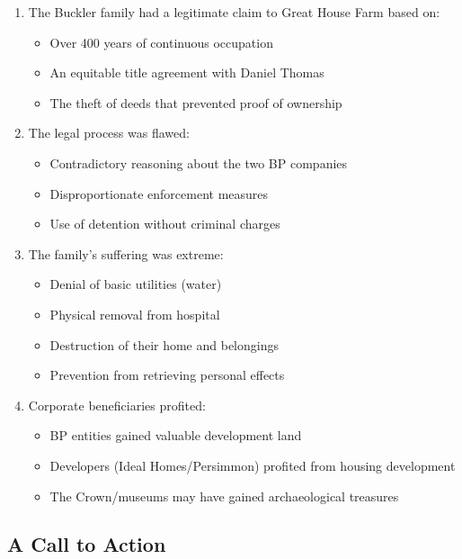 \documentclass[11pt,a4paper]{article}
\begin{document}
\begin{enumerate}[label=\arabic*.]
    \item The Buckler family had a legitimate claim to Great House Farm based on:
    \begin{itemize}
        \item Over 400 years of continuous occupation
        \item An equitable title agreement with Daniel Thomas
        \item The theft of deeds that prevented proof of ownership
    \end{itemize}
    
    \item The legal process was flawed:
    \begin{itemize}
        \item Contradictory reasoning about the two BP companies
        \item Disproportionate enforcement measures
        \item Use of detention without criminal charges
    \end{itemize}
    
    \item The family's suffering was extreme:
    \begin{itemize}
        \item Denial of basic utilities (water)
        \item Physical removal from hospital
        \item Destruction of their home and belongings
        \item Prevention from retrieving personal effects
    \end{itemize}
    
    \item Corporate beneficiaries profited:
    \begin{itemize}
        \item BP entities gained valuable development land
        \item Developers (Ideal Homes/Persimmon) profited from housing development
        \item The Crown/museums may have gained archaeological treasures
    \end{itemize}
\end{enumerate}

\subsection{A Call to Action}
\end{document}
